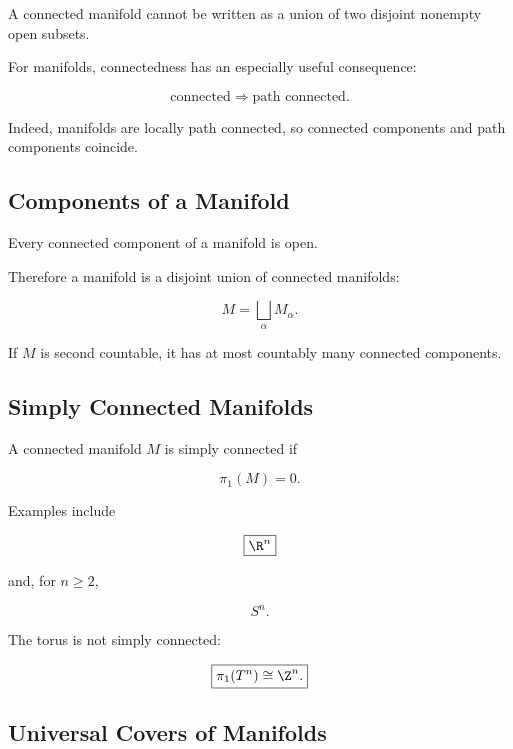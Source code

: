 A connected manifold cannot be written as a union of two disjoint nonempty
open subsets.

For manifolds, connectedness has an especially useful consequence:

\[
\boxed{
\text{connected}
\Longrightarrow
\text{path connected}.
}
\]

Indeed, manifolds are locally path connected, so connected components and
path components coincide.

\subsection{Components of a Manifold}
\label{subsec:components-manifold}

Every connected component of a manifold is open.

Therefore a manifold is a disjoint union of connected manifolds:

\[
\boxed{
M
=
\bigsqcup_{\alpha}M_\alpha.
}
\]

If \(M\) is second countable, it has at most countably many connected
components.

\subsection{Simply Connected Manifolds}
\label{subsec:simply-connected-manifolds}

A connected manifold \(M\) is simply connected if

\[
\boxed{
\pi_1(M)=0.
}
\]

Examples include

\[
\boxed{
\R^n
}
\]

and, for \(n\geq2\),

\[
\boxed{
S^n.
}
\]

The torus is not simply connected:

\[
\boxed{
\pi_1(T^n)\cong\Z^n.
}
\]

\subsection{Universal Covers of Manifolds}
\label{subsec:universal-covers-manifolds}

